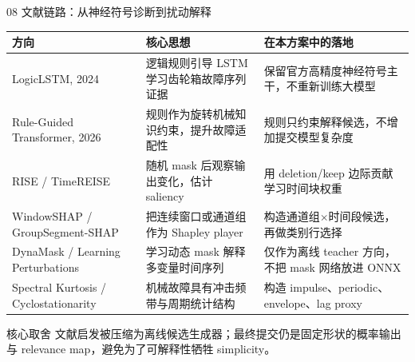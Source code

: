 \documentclass[aspectratio=169]{beamer}
\begin{document}
\begin{frame}{08 文献链路：从神经符号诊断到扰动解释}
    \small
    \begin{table}
        \centering
        \scriptsize
        \begin{tabular}{p{}p{}p{}}
            \toprule
            方向 & 核心思想 & 在本方案中的落地 \\
            \midrule
            LogicLSTM, 2024 & 逻辑规则引导 LSTM 学习齿轮箱故障序列证据 & 保留官方高精度神经符号主干，不重新训练大模型 \\
            Rule-Guided Transformer, 2026 & 规则作为旋转机械知识约束，提升故障适配性 & 规则只约束解释候选，不增加提交模型复杂度 \\
            RISE / TimeREISE & 随机 mask 后观察输出变化，估计 saliency & 用 deletion/keep 边际贡献学习时间块权重 \\
            WindowSHAP / GroupSegment-SHAP & 把连续窗口或通道组作为 Shapley player & 构造通道组$\times$时间段候选，再做类别行选择 \\
            DynaMask / Learning Perturbations & 学习动态 mask 解释多变量时间序列 & 仅作为离线 teacher 方向，不把 mask 网络放进 ONNX \\
            Spectral Kurtosis / Cyclostationarity & 机械故障具有冲击频带与周期统计结构 & 构造 impulse、periodic、envelope、lag proxy \\
            \bottomrule
        \end{tabular}
    \end{table}
    \begin{block}{核心取舍}
        文献启发被压缩为离线候选生成器；最终提交仍是固定形状的概率输出与 relevance map，避免为了可解释性牺牲 simplicity。
    \end{block}
\end{frame}
\end{document}
